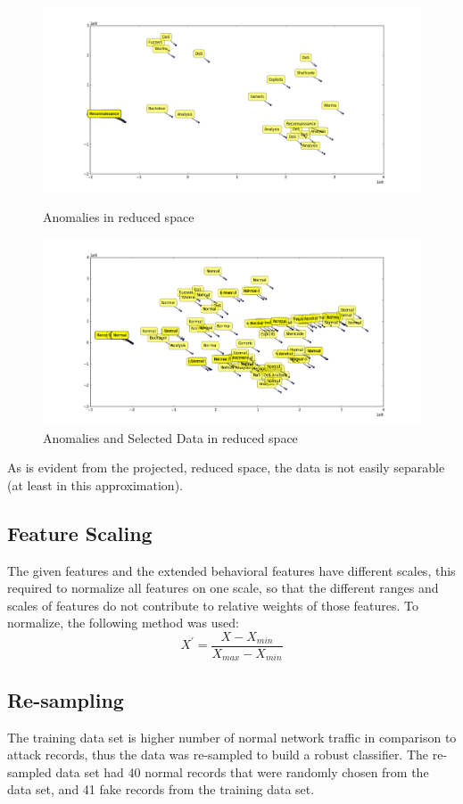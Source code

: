 \documentclass{llncs}
\begin{document}
\begin{figure}
  \includegraphics[width=\linewidth]{anamolies_tsne.png}
  \caption{Anomalies in reduced space}
  \label{fig:anomalies_tsne}
   \includegraphics[width=\linewidth]{anamolieswithnormal_tsne.png}
  \caption{Anomalies and Selected Data in reduced space}
  \label{fig:anomalies_data_tsne}
\end{figure}

As is evident from the projected, reduced space, the data is not easily separable (at least in this approximation).
\subsection{Feature Scaling}
The given features and the extended behavioral features have different scales, this required to normalize all features on one scale, so that the different ranges and scales of features do not contribute to relative weights of those features. To normalize, the following method was used:
\[ X^{'} =\frac{X - X_{min}}{X_{max} - X_{min}}   \]

\subsection{Re-sampling}
The training data set is higher number of normal network traffic in comparison to attack records, thus the data was re-sampled to build a robust classifier. The re-sampled data set had 40 normal records that were randomly chosen from the data set, and 41 fake records from the training data set.
\end{document}
